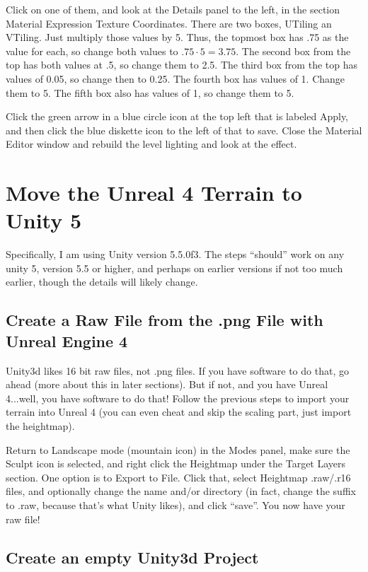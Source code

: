 \documentclass[letter,12pt]{article}
\begin{document}
Click on one of them, and look at the Details panel to the left, in the section Material Expression Texture Coordinates.  There are two boxes, UTiling an VTiling.  Just multiply those values by 5.  Thus, the topmost box has .75 as the value for each, so change both values to $.75\cdot5=3.75$.  The second box from the top has both values at .5, so change them to 2.5.   The third box from the top has values of 0.05, so change then to 0.25.  The fourth box has values of 1.  Change them to 5.  The fifth box also has values of 1, so change them to 5.

Click the green arrow in a blue circle icon at the top left that is labeled Apply, and then click the blue diskette icon to the left of that to save.  Close the Material Editor window and rebuild the level lighting and look at the effect.

\section{Move the Unreal 4 Terrain to Unity 5}
Specifically, I am using Unity version 5.5.0f3.  The steps “should” work on any unity 5, version 5.5 or higher, and perhaps on earlier versions if not too much earlier, though the details will likely change.

\subsection{Create a Raw File from the .png File with Unreal Engine 4}
Unity3d likes 16 bit raw files, not .png files.  If you have software to do that, go ahead (more about this in later sections).  But if not, and you have Unreal 4...well, you have software to do that!  Follow the previous steps to import your terrain into Unreal 4 (you can even cheat and skip the scaling part, just import the heightmap).

Return to Landscape mode (mountain icon) in the Modes panel, make sure the Sculpt icon is selected, and right click the Heightmap under the Target Layers section.  One option is to Export to File.  Click that, select Heightmap .raw/.r16 files, and optionally change the name and/or directory (in fact, change the suffix to .raw, because that’s what Unity likes), and click “save”.  You now have your raw file! 

\subsection{Create an empty Unity3d Project}
\end{document}
